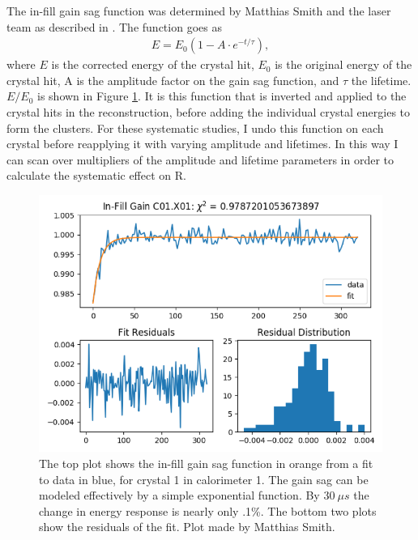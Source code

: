 		The in-fill gain sag function was determined by Matthias Smith and the laser team as described in . The function goes as  
			\begin{gather}
				E = E_{0}(1 - A \cdot e^{-t/\tau}),
			\label{Eqn:GainSag}
			\end{gather}
		where $E$ is the corrected energy of the crystal hit, $E_{0}$ is the original energy of the crystal hit, A is the amplitude factor on the gain sag function, and $\tau$ the lifetime. $E/E_{0}$ is shown in Figure \ref{Fig:MatthiasInFill}. It is this function that is inverted and applied to the crystal hits in the reconstruction, before adding the individual crystal energies to form the clusters. For these systematic studies, I undo this function on each crystal before reapplying it with varying amplitude and lifetimes. In this way I can scan over multipliers of the amplitude and lifetime parameters in order to calculate the systematic effect on R.

		\begin{figure}[h]
			\centering
			\includegraphics[width=.8\textwidth]{MatthiasInFill}
		    \caption[MatthiasInFill]{The top plot shows the in-fill gain sag function in orange from a fit to data in blue, for crystal 1 in calorimeter 1. The gain sag can be modeled effectively by a simple exponential function. By $\SI{30}{\mu s}$ the change in energy response is nearly only .1\%. The bottom two plots show the residuals of the fit. Plot made by Matthias Smith.}
		    \label{Fig:MatthiasInFill}
		\end{figure}

